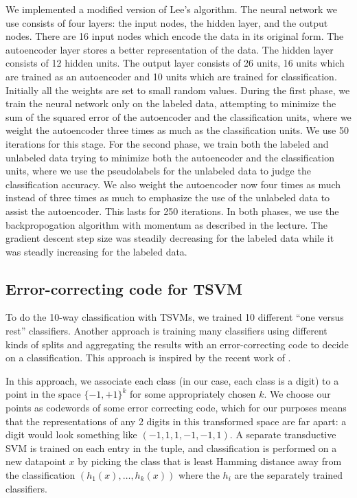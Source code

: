 \documentclass[11pt]{article}
\begin{document}
We implemented a modified version of Lee's algorithm. The neural network we use consists of four layers: the input nodes, the hidden layer, and the output nodes. There are 16 input nodes which encode the data in its original form. The autoencoder layer stores a better representation of the data. The hidden layer consists of 12 hidden units. The output layer consists of 26 units, 16 units which are trained as an autoencoder and 10 units which are trained for classification. Initially all the weights are set to small random values. During the first phase, we train the neural network only on the labeled data, attempting to minimize the sum of the squared error of the autoencoder and the classification units, where we weight the autoencoder three times as much as the classification units. We use 50 iterations for this stage. For the second phase, we train both the labeled and unlabeled data trying to minimize both the autoencoder and the classification units, where we use the pseudolabels for the unlabeled data to judge the classification accuracy. We also weight the autoencoder now four times as much instead of three times as much to emphasize the use of the unlabeled data to assist the autoencoder. This lasts for 250 iterations. In both phases, we use the backpropogation algorithm with momentum as described in the lecture. The gradient descent step size was steadily decreasing for the labeled data while it was steadly increasing for the labeled data.

\subsection{Error-correcting code for TSVM}

To do the 10-way classification with TSVMs, we trained 10 different ``one versus rest'' classifiers. Another approach is training many classifiers using different kinds of splits and aggregating the results with an error-correcting code to decide on a classification. This approach is inspired by the recent work of \cite{DBLP:journals/corr/BalcanDM15}.

In this approach, we associate each class (in our case, each class
is a digit) to a point in the space $\{-1,+1\}^k$
for some appropriately chosen $k$. We choose our points as codewords
of some error correcting code, which for our purposes means that the
representations of any 2 digits in this transformed space are
far apart: a digit would look something like $(-1,1,1,-1,-1,1)$.
A separate transductive SVM is trained on each entry in the tuple,
and classification is performed on a new datapoint $x$ by picking the
class that is least Hamming distance away from the classification
$(h_1(x),\ldots,h_k(x))$ where the $h_i$ are the separately trained
classifiers.
\end{document}
